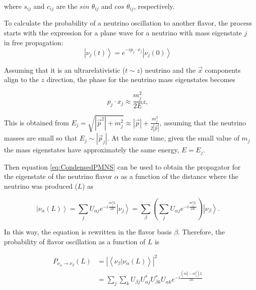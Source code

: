 where $s_{ij}$ and $c_{ij}$ are the $sin$ $\theta_{ij}$ and $cos$ $\theta_{ij}$, respectively. 

To calculate the probability of a neutrino oscillation to another flavor, the process starts  with the expression for a plane wave for a neutrino with mass eigenstate $j$ in free propagation: 
\begin{equation}
    \left| \nu_j (t)\right> = e^{-ip_j\cdot x_j}\left| \nu_j (0)\right>
\end{equation}

Assuming that it is an ultrarelativistic ($t\sim z$) neutrino and the $\Vec{x}$ components align to the $z$ direction, the phase for the neutrino mass eigenstates becomes 

\begin{equation}
    p_j\cdot x_j \approx \frac{m^2_j}{2E}z,
\end{equation}

This is obtained from $E_j = \sqrt{|\Vec{p}^2|+m^2_j}\approx |\Vec{p}| + \frac{m^2_j}{2|\Vec{p}|}$, assuming that the neutrino masses are small so that $E_j \sim |\Vec{p}_j|$. At the same time, given the small value of $m_j$ the mass eigenstates have approximately the same energy, $E=E_j$.

Then equation \ref{eq:CondensedPMNS} can be used to obtain the propagator for the eigenstate of the neutrino flavor $\alpha$ as a function of the distance where the neutrino was produced ($L$) as

\begin{equation}
    \left|\nu_\alpha (L)\right> = \sum_j U_{\alpha j}e^{-i\frac{m^2_j L}{2E}}\left|\nu_j \right>=\sum_\beta \left(\sum_j U_{\alpha j}e^{-i\frac{m^2_j L}{2E}}\right)\left|\nu_\beta \right>.
    \label{eq:NeutrinoPropagatorL}
\end{equation}

In this way, the equation is rewritten in the flavor basis $\beta$. Therefore, the probability of flavor oscillation as a function of $L$ is

\begin{equation}
    \begin{split}
        P_{\nu_\alpha\rightarrow\nu_\beta}(L) & =|\left<\nu_\beta | \nu_\alpha(L)\right>|^2 \\
        & = \sum_j\sum_k U_{\beta j} U^*_{\alpha j} U^*_{\beta k} U_{\alpha k} e^{-i\frac{(m^2_k - m^2_j)L}{2E}}
    \end{split}
\end{equation}

